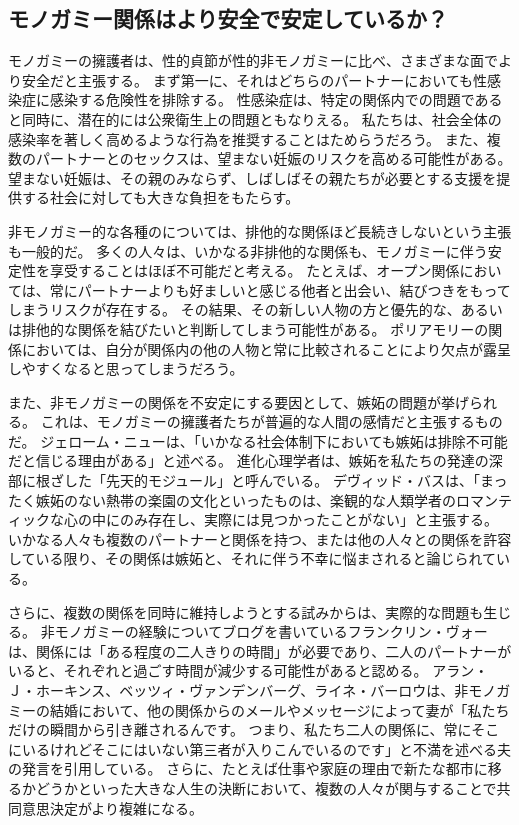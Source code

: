 \documentclass[paper=a4,book,openany]{jlreq} \usepackage{mystyle}
\begin{document}
\subsection{モノガミー関係はより安全で安定しているか？}

モノガミーの擁護者は、性的貞節が性的非モノガミーに比べ、さまざまな面でより安全だと主張する。
まず第一に、それはどちらのパートナーにおいても性感染症に感染する危険性を排除する。
性感染症は、特定の関係内での問題であると同時に、潜在的には公衆衛生上の問題ともなりえる。
私たちは、社会全体の感染率を著しく高めるような行為を推奨することはためらうだろう。
また、複数のパートナーとのセックスは、望まない妊娠のリスクを高める可能性がある。
望まない妊娠は、その親のみならず、しばしばその親たちが必要とする支援を提供する社会に対しても大きな負担をもたらす。

非モノガミー的な各種のについては、排他的な関係ほど長続きしないという主張も一般的だ。
多くの人々は、いかなる非排他的な関係も、モノガミーに伴う安定性を享受することはほぼ不可能だと考える。
たとえば、オープン関係においては、常にパートナーよりも好ましいと感じる他者と出会い、結びつきをもってしまうリスクが存在する。
その結果、その新しい人物の方と優先的な、あるいは排他的な関係を結びたいと判断してしまう可能性がある。
ポリアモリーの関係においては、自分が関係内の他の人物と常に比較されることにより欠点が露呈しやすくなると思ってしまうだろう。

また、非モノガミーの関係を不安定にする要因として、嫉妬の問題が挙げられる。
これは、モノガミーの擁護者たちが普遍的な人間の感情だと主張するものだ。
ジェローム・ニューは、「いかなる社会体制下においても嫉妬は排除不可能だと信じる理由がある」と述べる\citep[p.43]{new00:_jealous_thoug}。
進化心理学者は、嫉妬を私たちの発達の深部に根ざした「先天的モジュール」と呼んでいる。
デヴィッド・バスは、「まったく嫉妬のない熱帯の楽園の文化といったものは、楽観的な人類学者のロマンティックな心の中にのみ存在し、実際には見つかったことがない」と主張する\citep[p.961]{buss01:_human_natur_cultur}。
いかなる人々も複数のパートナーと関係を持つ、または他の人々との関係を許容している限り、その関係は嫉妬と、それに伴う不幸に悩まされると論じられている。

さらに、複数の関係を同時に維持しようとする試みからは、実際的な問題も生じる。
非モノガミーの経験についてブログを書いているフランクリン・ヴォーは、関係には「ある程度の二人きりの時間」が必要であり、二人のパートナーがいると、それぞれと過ごす時間が減少する可能性があると認める\citep{veaux09:_some_musin_time_manag}。
アラン・Ｊ・ホーキンス、ベッツィ・ヴァンデンバーグ、ライネ・バーロウは、非モノガミーの結婚において、他の関係からのメールやメッセージによって妻が「私たちだけの瞬間から引き離されるんです。
つまり、私たち二人の関係に、常にそこにいるけれどそこにはいない第三者が入りこんでいるのです」と不満を述べる夫の発言を引用している\citep{hawkins17:_new_math_consen_nonmon}。
さらに、たとえば仕事や家庭の理由で新たな都市に移るかどうかといった大きな人生の決断において、複数の人々が関与することで共同意思決定がより複雑になる。
\end{document}
